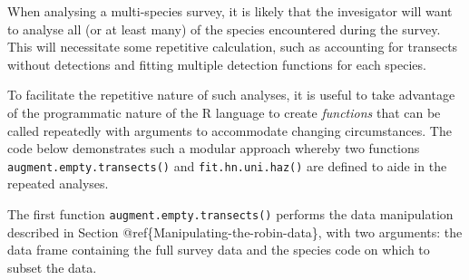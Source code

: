 \documentclass[10pt,a4paper]{tufte-handout}
\begin{document}
When analysing a multi-species survey, it is likely that the invesigator
will want to analyse all (or at least many) of the species encountered
during the survey. This will necessitate some repetitive calculation,
such as accounting for transects without detections and fitting multiple
detection functions for each species.

To facilitate the repetitive nature of such analyses, it is useful to
take advantage of the programmatic nature of the R language to create
\emph{functions} that can be called repeatedly with arguments to
accommodate changing circumstances. The code below demonstrates such a
modular approach whereby two functions
\texttt{augment.empty.transects()} and \texttt{fit.hn.uni.haz()} are
defined to aide in the repeated analyses.

The first function \texttt{augment.empty.transects()} performs the data
manipulation described in Section @ref\{Manipulating-the-robin-data\},
with two arguments: the data frame containing the full survey data and
the species code on which to subset the data.
\end{document}

